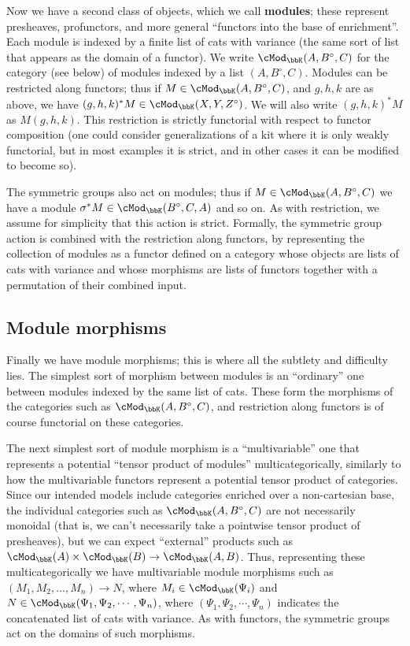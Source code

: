 \documentclass{amsart}
\newcommand{\K}{\bbK}
\let\mod\cMod
\def\modk{\mod_\K}
\renewcommand{\o}{^{\circ}}
\begin{document}
Now we have a second class of objects, which we call \textbf{modules}; these represent presheaves, profunctors, and more general ``functors into the base of enrichment''.
Each module is indexed by a finite list of cats with variance (the same sort of list that appears as the domain of a functor).
We write $\modk(A,B\o,C)$ for the category (see below) of modules indexed by a list $(A,B\o,C)$.
Modules can be restricted along functors; thus if $M\in \modk(A,B\o,C)$, and $g,h,k$ are as above, we have $(g,h,k)^*M \in \modk(X,Y,Z\o)$.
We will also write $(g,h,k)^*M$ as $M(g,h,k)$.
This restriction is strictly functorial with respect to functor composition (one could consider generalizations of a kit where it is only weakly functorial, but in most examples it is strict, and in other cases it can be modified to become so).

The symmetric groups also act on modules; thus if $M\in \modk(A,B\o,C)$ we have a module $\sigma^*M\in \modk(B\o,C,A)$ and so on.
As with restriction, we assume for simplicity that this action is strict.
Formally, the symmetric group action is combined with the restriction along functors, by representing the collection of modules as a functor defined on a category whose objects are lists of cats with variance and whose morphisms are lists of functors together with a permutation of their combined input.

\subsection{Module morphisms}

Finally we have module morphisms; this is where all the subtlety and difficulty lies.
The simplest sort of morphism between modules is an ``ordinary'' one between modules indexed by the same list of cats.
These form the morphisms of the categories such as $\modk(A,B\o,C)$, and restriction along functors is of course functorial on these categories.

The next simplest sort of module morphism is a ``multivariable'' one that represents a potential ``tensor product of modules'' multicategorically, similarly to how the multivariable functors represent a potential tensor product of categories.
Since our intended models include categories enriched over a non-cartesian base, the individual categories such as $\modk(A,B\o,C)$ are not necessarily monoidal (that is, we can't necessarily take a pointwise tensor product of presheaves), but we can expect ``external'' products such as $\modk(A) \times \modk(B) \to \modk(A,B)$.
Thus, representing these multicategorically we have multivariable module morphisms such as $(M_1,M_2,\dots,M_n) \to N$, where $M_i\in \modk(\Psi_i)$ and $N\in\modk(\Psi_1,\Psi_2,\cdots,\Psi_n)$, where $(\Psi_1,\Psi_2,\cdots,\Psi_n)$ indicates the concatenated list of cats with variance.
As with functors, the symmetric groups act on the domains of such morphisms.
\end{document}
